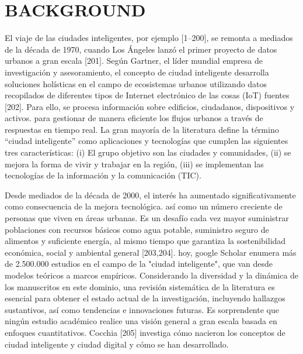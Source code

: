 \documentclass[a4paper,fleqn,spanish]{cas-dc}
\begin{document}

\lipsum[12]


\section{BACKGROUND}\label{marco}


El viaje de las ciudades inteligentes, por ejemplo [1–200], se remonta a
mediados de la década de 1970, cuando Los Ángeles lanzó el primer proyecto de
datos urbanos a gran escala [201]. Según Gartner, el líder mundial empresa de
investigación y asesoramiento, el concepto de ciudad inteligente desarrolla
soluciones holísticas en el campo de ecosistemas urbanos utilizando datos
recopilados de diferentes tipos de Internet electrónico de las cosas (IoT)
fuentes [202]. Para ello, se procesa información sobre edificios, ciudadanos,
dispositivos y activos.  para gestionar de manera eficiente los flujos urbanos
a través de respuestas en tiempo real. La gran mayoría de la literatura define
la término “ciudad inteligente” como aplicaciones y tecnologías que cumplen las
siguientes tres características: (i) El grupo objetivo son las ciudades y
comunidades, (ii) se mejora la forma de vivir y trabajar en la región, (iii) se
implementan las tecnologías de la información y la comunicación (TIC).

Desde mediados de la década de 2000, el interés ha aumentado significativamente
como consecuencia de la mejora tecnológica.  así como un número creciente de
personas que viven en áreas urbanas. Es un desafío cada vez mayor suministrar
poblaciones con recursos básicos como agua potable, suministro seguro de
alimentos y suficiente energía, al mismo tiempo que garantiza la sostenibilidad
económica, social y ambiental general [203,204]. hoy, google Scholar enumera
más de 2.500.000 estudios en el campo de la "ciudad inteligente", que van desde
modelos teóricos a marcos empíricos. Considerando la diversidad y la dinámica
de los manuscritos en este dominio, una revisión sistemática de la literatura
es esencial para obtener el estado actual de la investigación, incluyendo
hallazgos sustantivos, así como tendencias e innovaciones futuras. Es
sorprendente que ningún estudio académico realice una visión general a gran
escala basada en enfoques cuantitativos. Cocchia [205] investiga cómo nacieron
los conceptos de ciudad inteligente y ciudad digital y cómo se han desarrollado.
\end{document}
